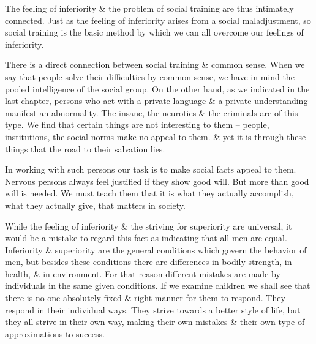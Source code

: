 \documentclass{article}
\numberwithin{equation}{section}
\begin{document}
The feeling of inferiority \& the problem of social training are thus intimately connected. Just as the feeling of inferiority arises from a social maladjustment, so social training is the basic method by which we can all overcome our feelings of inferiority.

There is a direct connection between social training \& common sense. When we say that people solve their difficulties by common sense, we have in mind the pooled intelligence of the social group. On the other hand, as we indicated in the last chapter, persons who act with a private language \& a private understanding manifest an abnormality. The insane, the neurotics \& the criminals are of this type. We find that certain things are not interesting to them -- people, institutions, the social norms make no appeal to them. \& yet it is through these things that the road to their salvation lies.

In working with such persons our task is to make social facts appeal to them. Nervous persons always feel justified if they show good will. But more than good will is needed. We must teach them that it is what they actually accomplish, what they actually give, that matters in society.

While the feeling of inferiority \& the striving for superiority are universal, it would be a mistake to regard this fact as indicating that all men are equal. Inferiority \& superiority are the general conditions which govern the behavior of men, but besides these conditions there are differences in bodily strength, in health, \& in environment. For that reason different mistakes are made by individuals in the same given conditions. If we examine children we shall see that there is no one absolutely fixed \& right manner for them to respond. They respond in their individual ways. They strive towards a better style of life, but they all strive in their own way, making their own mistakes \& their own type of approximations to success.
\end{document}
